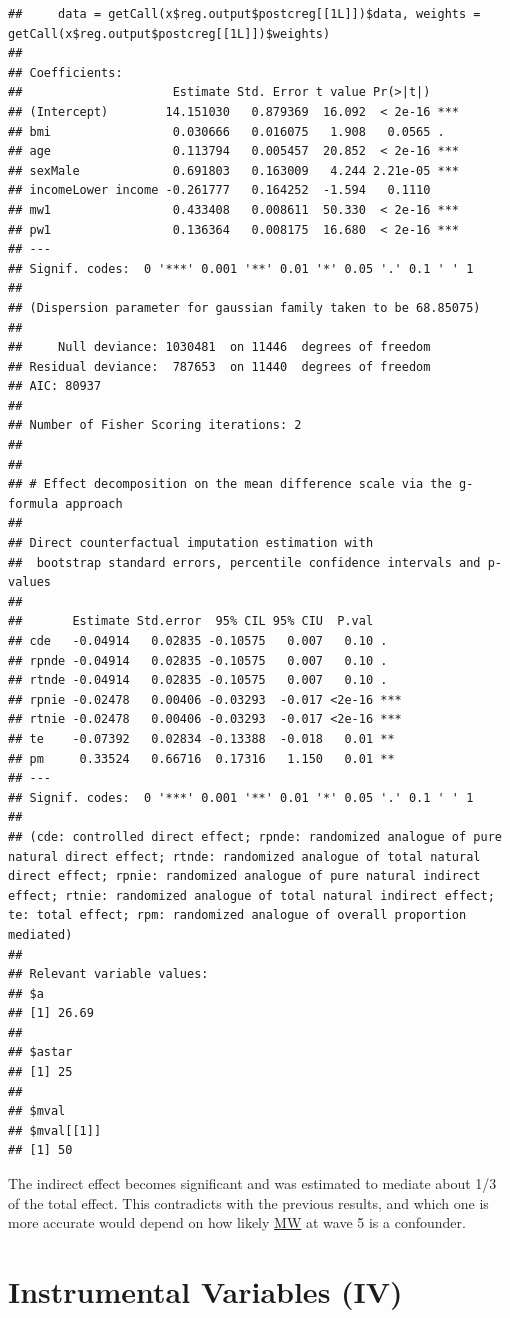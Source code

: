 \documentclass[
]{book}
\begin{document}
\begin{verbatim}
##     data = getCall(x$reg.output$postcreg[[1L]])$data, weights = getCall(x$reg.output$postcreg[[1L]])$weights)
## 
## Coefficients:
##                     Estimate Std. Error t value Pr(>|t|)    
## (Intercept)        14.151030   0.879369  16.092  < 2e-16 ***
## bmi                 0.030666   0.016075   1.908   0.0565 .  
## age                 0.113794   0.005457  20.852  < 2e-16 ***
## sexMale             0.691803   0.163009   4.244 2.21e-05 ***
## incomeLower income -0.261777   0.164252  -1.594   0.1110    
## mw1                 0.433408   0.008611  50.330  < 2e-16 ***
## pw1                 0.136364   0.008175  16.680  < 2e-16 ***
## ---
## Signif. codes:  0 '***' 0.001 '**' 0.01 '*' 0.05 '.' 0.1 ' ' 1
## 
## (Dispersion parameter for gaussian family taken to be 68.85075)
## 
##     Null deviance: 1030481  on 11446  degrees of freedom
## Residual deviance:  787653  on 11440  degrees of freedom
## AIC: 80937
## 
## Number of Fisher Scoring iterations: 2
## 
## 
## # Effect decomposition on the mean difference scale via the g-formula approach
##  
## Direct counterfactual imputation estimation with 
##  bootstrap standard errors, percentile confidence intervals and p-values 
##  
##       Estimate Std.error  95% CIL 95% CIU  P.val    
## cde   -0.04914   0.02835 -0.10575   0.007   0.10 .  
## rpnde -0.04914   0.02835 -0.10575   0.007   0.10 .  
## rtnde -0.04914   0.02835 -0.10575   0.007   0.10 .  
## rpnie -0.02478   0.00406 -0.03293  -0.017 <2e-16 ***
## rtnie -0.02478   0.00406 -0.03293  -0.017 <2e-16 ***
## te    -0.07392   0.02834 -0.13388  -0.018   0.01 ** 
## pm     0.33524   0.66716  0.17316   1.150   0.01 ** 
## ---
## Signif. codes:  0 '***' 0.001 '**' 0.01 '*' 0.05 '.' 0.1 ' ' 1
## 
## (cde: controlled direct effect; rpnde: randomized analogue of pure natural direct effect; rtnde: randomized analogue of total natural direct effect; rpnie: randomized analogue of pure natural indirect effect; rtnie: randomized analogue of total natural indirect effect; te: total effect; rpm: randomized analogue of overall proportion mediated)
## 
## Relevant variable values: 
## $a
## [1] 26.69
## 
## $astar
## [1] 25
## 
## $mval
## $mval[[1]]
## [1] 50
\end{verbatim}

The indirect effect becomes significant and was estimated to mediate about 1/3 of the total effect. This contradicts with the previous results, and which one is more accurate would depend on how likely \hyperref[acronyms_MW]{MW} at wave 5 is a confounder.

\section{Instrumental Variables (IV)}\label{instrumental-variables-iv}
\end{document}
